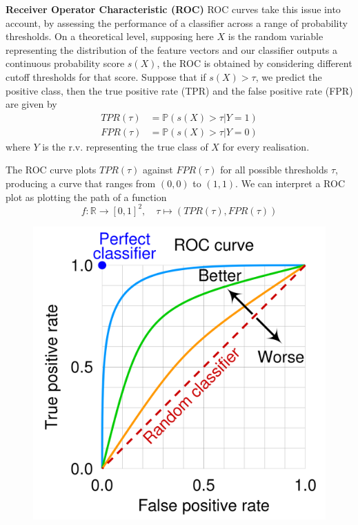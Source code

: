\textbf{Receiver Operator Characteristic (ROC)}
ROC curves take this issue into account, by assessing the performance of a classifier across a range of probability thresholds.
On a theoretical level, supposing here $X$ is the random variable representing the distribution of the feature vectors 
and our classifier outputs a continuous probability score $s(X)$, the ROC is obtained by considering different cutoff thresholds for that score.
Suppose that if $s(X) > \tau$, we predict the positive class, then the true positive rate (TPR) and the false positive rate (FPR) are given by
\[
    	\begin{aligned}
    		TPR(\tau) &= \mathbb{P}(s(X) > \tau | Y = 1) \\
    		FPR(\tau) &= \mathbb{P}(s(X) > \tau | Y = 0)
    	\end{aligned}
\]
where $Y$ is the r.v. representing the true class of $X$ for every realisation. 

The ROC curve plots $TPR(\tau)$ against $FPR(\tau)$ for all possible thresholds $\tau$, producing a curve that ranges from $(0,0)$ to $(1,1)$.
We can interpret a ROC plot as plotting the path of a function
\[
	f: \mathbb{R} \to [0,1]^2, \quad  \tau \mapsto (TPR(\tau), FPR(\tau))
\]

\begin{figure}[H]
  	\centering
  	\includegraphics[width=\linewidth]{assets/Roc_curve.png}
  	\label{fig:roc_curve}
\end{figure}

